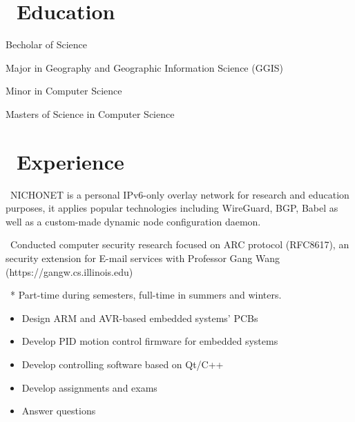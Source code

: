 \documentclass{resume}
\begin{document}


 
\section{\faGraduationCap\  Education}
Becholar of Science

Major in Geography and Geographic Information Science (GGIS)

Minor in Computer Science

Masters of Science in Computer Science

\section{\faUsers\ Experience}
\
NICHONET is a personal IPv6-only overlay network for research and education purposes, it applies popular technologies including WireGuard, BGP, Babel as well as a custom-made dynamic node configuration daemon.

\role{Research Assistant}\
Conducted computer security research focused on ARC protocol (RFC8617), an security extension for E-mail services with Professor Gang Wang (https://gangw.cs.illinois.edu)

\
* Part-time during semesters, full-time in summers and winters.
\begin{itemize}
  \item Design ARM and AVR-based embedded systems' PCBs
  \item Develop PID motion control firmware for embedded systems
  \item Develop controlling software based on Qt/C++
\end{itemize}

\begin{itemize}
  \item Develop assignments and exams
  \item Answer questions
\end{itemize}
\end{document}
